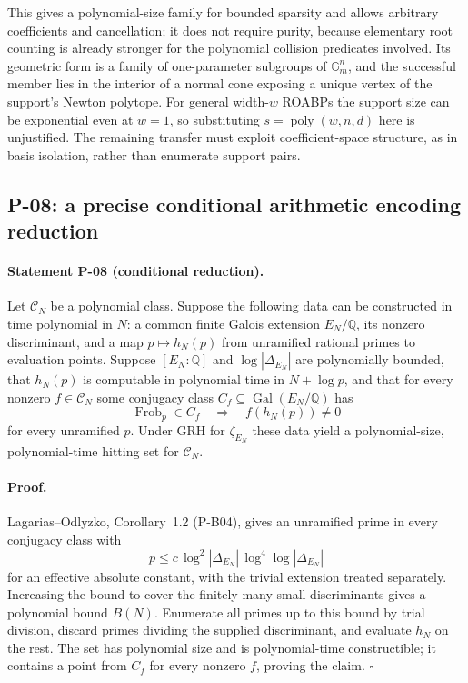 \documentclass[11pt,a4paper]{article}
\theoremstyle{definition}\newtheorem{definition}{Definition}
\begin{document}
This gives a polynomial-size family for bounded sparsity and allows arbitrary coefficients and cancellation; it does not require purity, because elementary root counting is already stronger for the polynomial collision predicates involved. Its geometric form is a family of one-parameter subgroups of $\mathbb G_m^n$, and the successful member lies in the interior of a normal cone exposing a unique vertex of the support's Newton polytope. For general width-$w$ ROABPs the support size can be exponential even at $w=1$, so substituting $s=\operatorname{poly}(w,n,d)$ here is unjustified. The remaining transfer must exploit coefficient-space structure, as in basis isolation, rather than enumerate support pairs.

\subsection{P-08: a precise conditional arithmetic encoding reduction}
\paragraph{Statement P-08 (conditional reduction).}
Let $\mathcal C_N$ be a polynomial class. Suppose the following data can be constructed in time polynomial in $N$: a common finite Galois extension $E_N/\mathbb Q$, its nonzero discriminant, and a map $p\mapsto h_N(p)$ from unramified rational primes to evaluation points. Suppose $[E_N:\mathbb Q]$ and $\log|\Delta_{E_N}|$ are polynomially bounded, that $h_N(p)$ is computable in polynomial time in $N+\log p$, and that for every nonzero $f\in\mathcal C_N$ some conjugacy class $C_f\subseteq\operatorname{Gal}(E_N/\mathbb Q)$ has
\[
 \operatorname{Frob}_p\in C_f\quad\Longrightarrow\quad f(h_N(p))\ne0
\]
for every unramified $p$. Under GRH for $\zeta_{E_N}$ these data yield a polynomial-size, polynomial-time hitting set for $\mathcal C_N$.
\paragraph{Proof.}
Lagarias--Odlyzko, Corollary~1.2 (P-B04), gives an unramified prime in every conjugacy class with
\[
 p\le c\,\log^2|\Delta_{E_N}|\,\log^4\log|\Delta_{E_N}|
\]
for an effective absolute constant, with the trivial extension treated separately. Increasing the bound to cover the finitely many small discriminants gives a polynomial bound $B(N)$. Enumerate all primes up to this bound by trial division, discard primes dividing the supplied discriminant, and evaluate $h_N$ on the rest. The set has polynomial size and is polynomial-time constructible; it contains a point from $C_f$ for every nonzero $f$, proving the claim. $\square$
\end{document}
